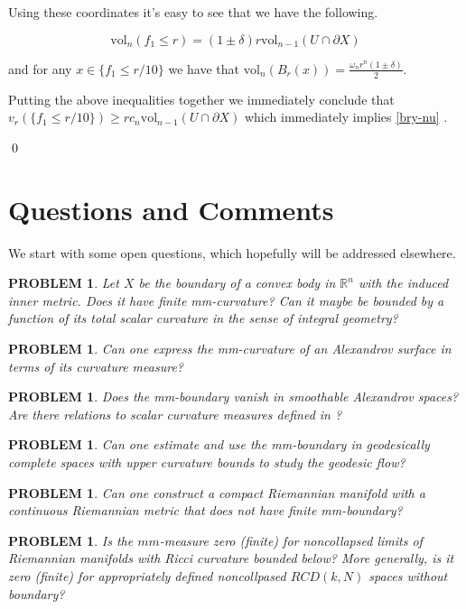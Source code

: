 \documentclass[12pt,leqno]{amsart}
\numberwithin{equation}{section}
\newtheorem{quest}[thm]{PROBLEM}
\theoremstyle{definition}
\theoremstyle{remark}
\newcommand{\vol}{\mathrm{vol}}
\newcommand{\R}{\mathbb{R}}
\def\qeds{\qed\par\medskip}
\def\qedsf{\vskip-6mm\qeds}
\begin{document}
Using these coordinates it's easy to see that we have the following.

\[
\vol_n(f_1\le r)=(1\pm\delta)r\vol_{n-1}(U\cap\partial X)
\]

and for any $x\in \{f_1\le r/10\}$ we have that $\vol_n(B_r(x))=\frac{\omega_nr^n(1\pm\delta)}{2}$.

Putting the above inequalities together we immediately conclude that $v_r( \{f_1\le r/10\})\ge rc_n\vol_{n-1}(U\cap\partial X)$ which immediately implies \eqref{bry-nu} .

\qedsf

\section{Questions and Comments} \label{sec:final}
We start with some open questions, which hopefully will be addressed elsewhere.










\begin{quest} Let $X$ be the boundary of a convex body in $\R ^n$ with the induced inner metric.
Does it have finite mm-curvature?  Can it maybe be bounded by a function of its total scalar curvature
in the sense of integral geometry?
\end{quest}


\begin{quest}
Can one express the mm-curvature of an Alexandrov  surface in terms of its curvature measure?
\end{quest}

\begin{quest}
Does the mm-boundary vanish  in smoothable Alexandrov spaces?   Are there relations to scalar curvature measures defined in \cite{LP}?
\end{quest}


\begin{quest}
Can one estimate and use the mm-boundary in geodesically complete spaces with upper curvature bounds to study the geodesic flow?
\end{quest}



\begin{quest}
 Can one construct a compact Riemannian manifold with a continuous Riemannian metric
that does not have finite mm-boundary?
\end{quest}
{\color{red}
\begin{quest}
Is the $mm$-measure zero (finite) for noncollapsed limits of Riemannian manifolds with Ricci curvature bounded below? More generally, is it zero (finite) for appropriately defined noncollpased $RCD(k,N)$ spaces without boundary?
\end{quest}
}



\end{document}
